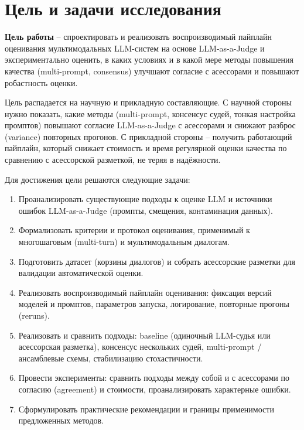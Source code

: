 \section{Цель и задачи исследования}
\label{sec:intro:goals}

\textbf{Цель работы} -- спроектировать и реализовать воспроизводимый
пайплайн оценивания мультимодальных LLM-систем на основе
LLM-as-a-Judge и экспериментально оценить, в каких условиях и в какой
мере методы повышения качества (multi-prompt, consensus) улучшают
согласие с асессорами и повышают робастность оценки.

Цель распадается на научную и прикладную составляющие.
С научной стороны нужно показать, какие методы (multi-prompt,
консенсус судей, тонкая настройка промптов) повышают согласие
LLM-as-a-Judge с асессорами и снижают разброс (variance) повторных
прогонов.
С прикладной стороны -- получить работающий пайплайн, который снижает
стоимость и время регулярной оценки качества по сравнению с
асессорской разметкой, не теряя в надёжности.

Для достижения цели решаются следующие задачи:

\begin{enumerate}
    \item Проанализировать существующие подходы к оценке LLM и источники
        ошибок LLM-as-a-Judge (промпты, смещения, контаминация данных).
    \item Формализовать критерии и протокол оценивания, применимый к
        многошаговым (multi-turn) и мультимодальным диалогам.
    \item Подготовить датасет (корзины диалогов) и собрать асессорские
        разметки для валидации автоматической оценки.
    \item Реализовать воспроизводимый пайплайн оценивания: фиксация
        версий моделей и промптов, параметров запуска, логирование,
        повторные прогоны (reruns).
    \item Реализовать и сравнить подходы: baseline (одиночный
        LLM-судья или асессорская разметка), консенсус нескольких
        судей, multi-prompt / ансамблевые схемы, стабилизацию
        стохастичности.
    \item Провести эксперименты: сравнить подходы между собой и с
        асессорами по согласию (agreement) и стоимости, проанализировать
        характерные ошибки.
    \item Сформулировать практические рекомендации и границы
        применимости предложенных методов.
\end{enumerate}

